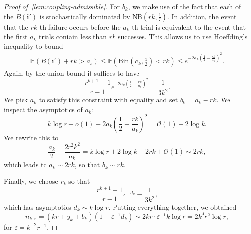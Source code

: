 \documentclass[11pt]{article}
\theoremstyle{definition}
\theoremstyle{remark}
\theoremstyle{remark}
\numberwithin{theorem}{section}
\providecommand{\P}{}
\renewcommand{\P}{\mathbb{P}}
\newcommand{\bigO}{\mathcal{O}}
\begin{document}
\begin{proof}[Proof of~\cref{lem:coupling-admissible}]
    For $b_k$, we make use of the fact that each of the $B(\bm i')$ is stochastically dominated by $\text{NB}(rk,\frac12)$. In addition, the event that the $rk$-th failure occurs before the $a_k$-th trial is equivalent to the event that the first $a_k$ trials contain less than $rk$ successes. This allows us to use Hoeffding's inequality to bound
    \begin{align*}
    \P(B(\bm i')+rk>a_k)\le \P(\text{Bin}(a_k,\tfrac12)<rk)\le e^{-2a_k\left(\frac12-\frac{rk}{a_k}\right)^2}.
    \end{align*}
    Again, by the union bound it suffices to have
    \[
    \frac{r^{k+1}-1}{r-1}e^{-2a_k\left(\frac12-\frac{rk}{a_k}\right)^2}=\frac1{3k^2}.
    \]
    We pick $a_k$ to satisfy this constraint with equality and set $b_k=a_k-rk$. We inspect the asymptotics of $a_k$:
    \[
    k\log r+o(1)-2a_k\left(\frac12-\frac{rk}{a_k}\right)^2=\bigO(1)-2\log k.
    \]
    We rewrite this to
    \[
    \frac{a_k}{2}+\frac{2r^2k^2}{a_k}=k\log r+2\log k+2rk+\bigO(1)\sim 2rk,
    \]
    which leads to $a_k\sim 2rk$, so that $b_k\sim rk$.
    
    Finally, we choose $r_k$ so that
    \[
    \frac{r^{k+1}-1}{r-1}e^{-d_k}=\frac1{3k^2},
    \]
    which has asymptotics $d_k\sim k\log r$.
    Putting everything together, we obtained
    \[
    n_{k,r}=(kr+y_k+b_k)(1+\varepsilon^{-1}d_k)\sim 2kr\cdot \varepsilon^{-1}k\log r=2k^4r^2\log r,
    \]
    for $\varepsilon=k^{-2}r^{-1}$.
\end{proof}
\end{document}
